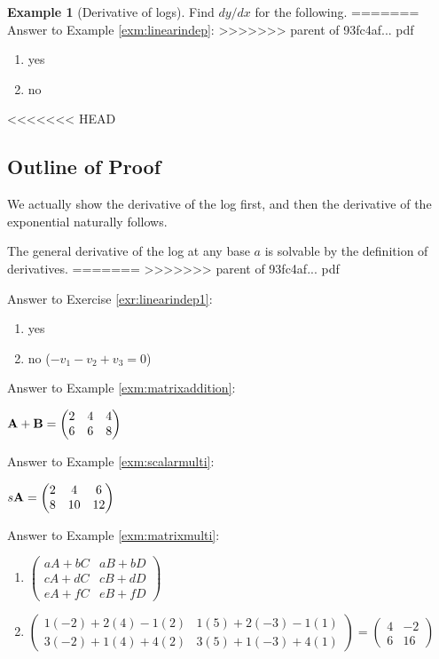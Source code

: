 \documentclass[]{book}
\providecommand{\tightlist}{%
  \setlength{\itemsep}{0pt}\setlength{\parskip}{0pt}}
\theoremstyle{definition}
\theoremstyle{definition}
\newtheorem{example}{Example}[chapter]
\theoremstyle{definition}
\theoremstyle{remark}
\begin{document}
\begin{example}[Derivative of logs]
\protect\hypertarget{exm:exmderivlog}{}{\label{exm:exmderivlog} {} }Find \(dy/dx\) for the following.
=======
Answer to Example \ref{exm:linearindep}:
>>>>>>> parent of 93fc4af... pdf

\begin{enumerate}
\def\labelenumi{\arabic{enumi}.}
\tightlist
\item
  yes
\item
  no
\end{enumerate}
<<<<<<< HEAD
\end{example}

\hypertarget{outline-of-proof}{%
\subsection*{Outline of Proof}\label{outline-of-proof}}

We actually show the derivative of the log first, and then the derivative of the exponential naturally follows.

The general derivative of the log at any base \(a\) is solvable by the definition of derivatives.
=======
>>>>>>> parent of 93fc4af... pdf

Answer to Exercise \ref{exr:linearindep1}:

\begin{enumerate}
\def\labelenumi{\arabic{enumi}.}
\tightlist
\item
  yes
\item
  no (\(-v_1 -v_2 + v_3 = 0\))
\end{enumerate}

Answer to Example \ref{exm:matrixaddition}:

\({\bf A+B}=\begin{pmatrix} 2 & 4 & 4 \\ 6 & 6 & 8 \end{pmatrix}\)

Answer to Example \ref{exm:scalarmulti}:

\(s {\bf A} = \begin{pmatrix} 2 & 4 & 6 \\ 8 & 10 & 12 \end{pmatrix}\)

Answer to Example \ref{exm:matrixmulti}:

\begin{enumerate}
\def\labelenumi{\arabic{enumi}.}
\item
  \(\begin{pmatrix} aA+bC&aB+bD\\cA+dC&cB+dD\\eA+fC&eB+fD \end{pmatrix}\)
\item
  \(\begin{pmatrix} 1(-2)+2(4)-1(2)&1(5)+2(-3)-1(1)\\  3(-2)+1(4)+4(2)&3(5)+1(-3)+4(1)\end{pmatrix} =  \begin{pmatrix} 4&-2\\6&16\end{pmatrix}\)
\end{enumerate}
\end{document}
